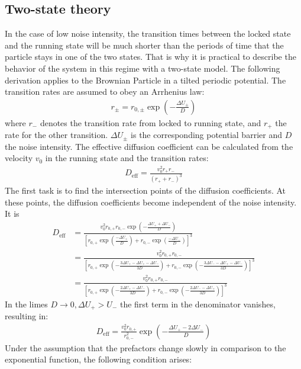 \documentclass[12pt,a4paper]{article}
\begin{document}
\subsection{Two-state theory}
In the case of low noise intensity, the transition times between the locked state and the running state will be much shorter than the periods of time that the particle stays in one of the two states. That is why it is practical to describe the behavior of the system in this regime with a two-state model. The following derivation applies to the Brownian Particle in a tilted periodic potential. The transition rates are assumed to obey an Arrhenius law:
\begin{align*}
r_{\pm}=r_{0,\pm}\exp\left(-\frac{\Delta U_{\pm}}{D}\right)
\end{align*}
where $r_-$ denotes the transition rate from locked to running state, and $r_+$ the rate for the other transition. $\Delta U_{\pm}$ is the corresponding potential barrier and $D$ the noise intensity. The effective diffusion coefficient can be calculated from the velocity $v_0$ in the running state and the transition rates: 
\begin{align*}
D_{\text{eff}}=\frac{v_0^2 r_+r_-}{(r_++r_-)^3}
\end{align*}
The first task is to find the intersection points of the diffusion coefficients. At these points, the diffusion coefficients become independent of the noise intensity.
It is
\begin{align*}
D_{\text{eff}}&=\frac{v_0^2r_{0,+}r_{0,-}\exp\left(-\frac{\Delta U_++\Delta U_-}{D}\right)}{\left[r_{0,+}\exp(\frac{-\Delta U_+}{D})+r_{0,-}\exp\left(\frac{-\Delta U_-}{D}\right)\right]^3}\\&=\frac{v_0^2r_{0,+}r_{0,-}}{\left[r_{0,+}\exp\left(-\frac{3\Delta U_+-\Delta U_+-\Delta U_-}{3D}\right)+r_{0,-}\exp\left(-\frac{3\Delta U_--\Delta U_+ -\Delta U_-}{3D}\right)\right]^3}\\&=\frac{v_0^2r_{0,+}r_{0,-}}{\left[r_{0,+}\exp\left(-\frac{2\Delta U_+-\Delta U_-}{3D}\right)+r_{0,-}\exp\left(-\frac{2\Delta U_--\Delta U_+}{3D}\right)\right]^3}
\end{align*}
In the limes $D\rightarrow 0,\Delta U_+>U_-$ the first term in the denominator vanishes, resulting in:
\begin{align*}
D_{\text{eff}}=\frac{v_0^2r_{0,+}}{r_{0,-}^2}\exp\left(-\frac{\Delta U_+-2\Delta U_-}{D}\right)
\end{align*}
Under the assumption that the prefactors change slowly in comparison to the exponential function, the following condition arises:
\end{document}
